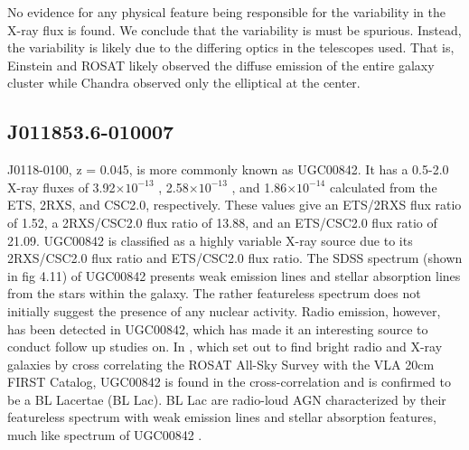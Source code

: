 
No evidence for any physical feature being responsible for the variability in the X-ray flux is found. 
We conclude that the variability is must be spurious. 
Instead, the variability is likely due to the differing optics in the telescopes used. 
That is, Einstein and ROSAT likely observed the diffuse emission of the entire galaxy cluster while Chandra observed only the elliptical at the center. 

\FloatBarrier



\subsection{ J011853.6-010007}



J0118-0100, z = 0.045, is more commonly known as UGC00842. 
It has a 0.5-2.0 X-ray fluxes of 3.92$\times 10^{-13}$ \fluxunits, 2.58$\times 10^{-13}$ \fluxunits, and 1.86$\times 10^{-14}$ \fluxunits calculated from the ETS, 2RXS, and CSC2.0, respectively. 
These values give an ETS/2RXS flux ratio of 1.52, a 2RXS/CSC2.0 flux ratio of 13.88, and an ETS/CSC2.0 flux ratio of 21.09. 
UGC00842 is classified as a highly variable X-ray source due to its 2RXS/CSC2.0 flux ratio and ETS/CSC2.0 flux ratio. 
The SDSS spectrum (shown in fig 4.11) of UGC00842 presents weak emission lines and stellar absorption lines from the stars within the galaxy.
The rather featureless spectrum does not initially suggest the presence of any nuclear activity. 
Radio emission, however, has been detected in UGC00842, which has made it an interesting source to conduct follow up studies on. 
In \cite{brinkmann2000}, which set out to find bright radio and X-ray galaxies by cross correlating the ROSAT All-Sky Survey with the VLA 20cm FIRST Catalog, UGC00842 is found in the cross-correlation and is confirmed to be a BL Lacertae (BL Lac). 
BL Lac are radio-loud AGN characterized by their featureless spectrum with weak emission lines and stellar absorption features, much like spectrum of UGC00842 \citep{falomo2014}.


